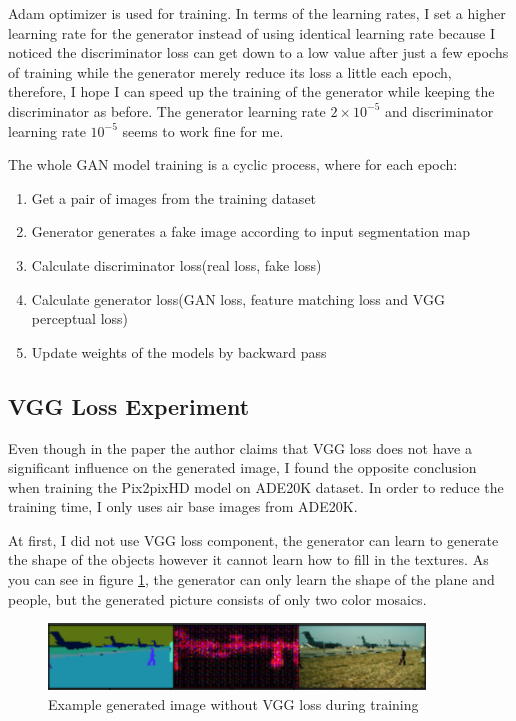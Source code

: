 Adam optimizer is used for training.
In terms of the learning rates, I set a higher learning rate for the generator instead of using 
identical learning rate because I noticed the discriminator loss can get down to a low value 
after just a few epochs of training while the generator merely reduce its loss a little 
each epoch, therefore, I hope I can speed up the training of the generator while keeping the 
discriminator as before. The generator learning rate $2\times10^{-5}$ and discriminator learning 
rate $10^{-5}$ seems to work fine for me. 

The whole GAN model training is a cyclic process, where for each epoch:
\begin{enumerate}
    \item Get a pair of images from the training dataset
    \item Generator generates a fake image according to input segmentation map
    \item Calculate discriminator loss(real loss, fake loss)
    \item Calculate generator loss(GAN loss, feature matching loss and VGG perceptual loss)
    \item Update weights of the models by backward pass
\end{enumerate}

\subsection{VGG Loss Experiment}
Even though in the paper the author claims that VGG loss does not have a significant influence on 
the generated image, I found the opposite conclusion when training the Pix2pixHD model on ADE20K 
dataset. In order to reduce the training time, I only uses air base images from ADE20K. 

At first, 
I did not use VGG loss component, the generator can learn to generate the shape of the objects 
however it cannot learn how to fill in the textures. As you can see in figure \ref{fig:without-VGG}, 
the generator can only learn the shape of the plane and people, but the generated picture 
consists of only two color mosaics.
\begin{figure}[H]
    \begin{center}
    \includegraphics[width=10cm]{figures/without-VGG}
    \end{center}
    \caption{Example generated image without VGG loss during training}
    \label{fig:without-VGG}
\end{figure}

